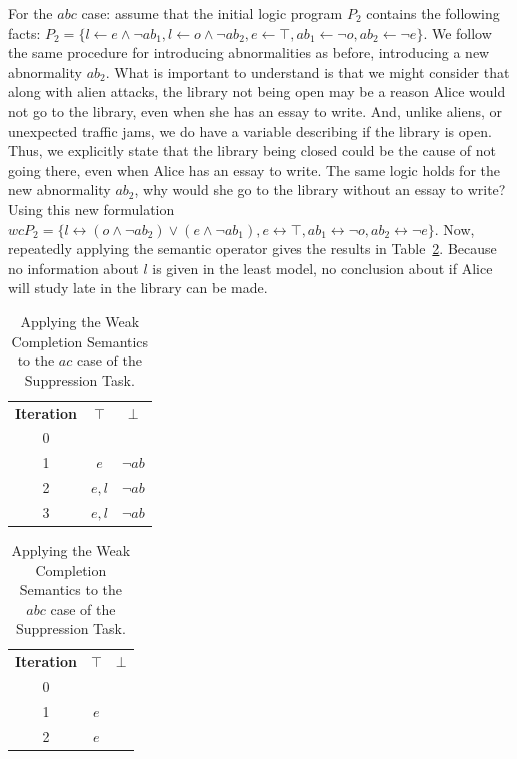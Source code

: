 \documentclass{article}
\begin{document}
For the $abc$ case: assume that the initial logic program $P_2$ contains the following facts: $P_2=\{l\leftarrow e \land \lnot ab_1, l  \leftarrow o \land \lnot ab_2, e \leftarrow \top, ab_1\leftarrow \lnot o, ab_2 \leftarrow \lnot e\}$. We follow the same procedure for introducing abnormalities as before, introducing a new abnormality $ab_2$. What is important to understand is that we might consider that along with alien attacks, the library not being open may be a reason Alice would not go to the library, even when she has an essay to write. And, unlike aliens, or unexpected traffic jams, we do have a variable describing if the library is open. Thus, we explicitly state that the library being closed could be the cause of not going there, even when Alice has an essay to write. The same logic holds for the new abnormality $ab_2$, why would she go to the library without an essay to write? Using this new formulation $wcP_2=\{l\leftrightarrow (o \land \lnot ab_2) \lor (e \land \lnot ab_1) , e \leftrightarrow \top, ab_1\leftrightarrow \lnot o, ab_2 \leftrightarrow \lnot e\}$. Now, repeatedly applying the semantic operator gives the results in Table~\ref{tbl:suppABC}. Because no information about $l$ is given in the least model, no conclusion about if Alice will study late in the library can be made.

\begin{table}
\begin{center}

\begin{tabular}{ c c c }
 \textbf{Iteration} & \textbf{$\top$} & \textbf{$\bot$} \\ 
 0 &  &  \\  
 1 & $e$ & $\lnot ab$ \\  
 2 & $e,l$ & $\lnot ab$ \\  
 3 & $e,l$ & $\lnot ab$ 
\end{tabular}
\caption{Applying the Weak Completion Semantics to the $ac$ case of the Suppression Task.}
\label{tbl:suppAC}

\end{center}
\end{table}

\begin{table}

\begin{center}
\begin{tabular}{ c c c }
 \textbf{Iteration} & \textbf{$\top$} & \textbf{$\bot$} \\ 
 0 &  &  \\  
 1 & $e$ &  \\  
 2 & $e$ &  
\end{tabular}
\caption{Applying the Weak Completion Semantics to the $abc$ case of the Suppression Task.}
\label{tbl:suppABC}

\end{center}
\end{table}
\end{document}

